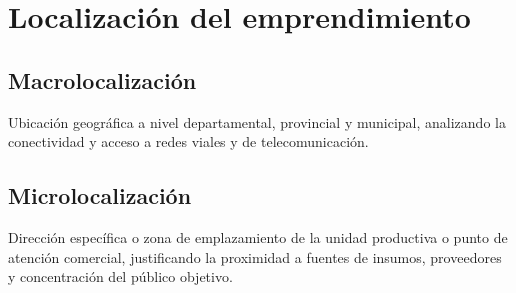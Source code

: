 \section{Localización del emprendimiento}
\label{sec:localizacion}

\subsection{Macrolocalización}
Ubicación geográfica a nivel departamental, provincial y municipal, analizando la conectividad y acceso a redes viales y de telecomunicación.

\subsection{Microlocalización}
Dirección específica o zona de emplazamiento de la unidad productiva o punto de atención comercial, justificando la proximidad a fuentes de insumos, proveedores y concentración del público objetivo.

